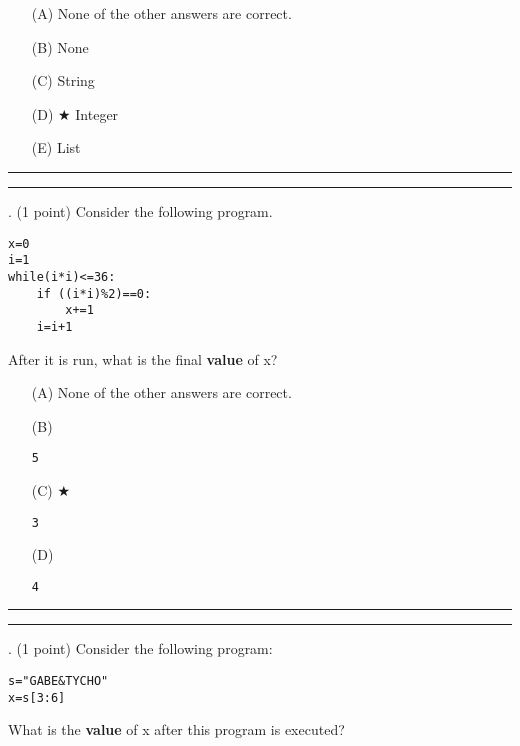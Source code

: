 \documentclass{article}
\begin{document}
\begin{enumerate}
\item[(A)]
None of the other answers are correct.

\item[(B)]
None

\item[(C)]
String

\item[(D)] $\bigstar$ 
Integer

\item[(E)]
List

\end{enumerate}

\vspace*{2em}
\hrule
\vspace{2em}

\vspace{2em}
\hrule height 2pt


\newpage
{}. (1 point)
Consider the following program.
\begin{verbatim}
x=0
i=1
while(i*i)<=36:
    if ((i*i)%2)==0:
        x+=1
    i=i+1
\end{verbatim}
After it is run, what is the final \textbf{value} of x?


\begin{enumerate}
\item[(A)]
None of the other answers are correct.

\item[(B)]
\begin{verbatim}5\end{verbatim}

\item[(C)] $\bigstar$ 
\begin{verbatim}3\end{verbatim}

\item[(D)]
\begin{verbatim}4\end{verbatim}

\end{enumerate}

\vspace*{2em}
\hrule
\vspace{2em}

\vspace{2em}
\hrule height 2pt


\newpage
{}. (1 point)
Consider the following program:
\begin{verbatim}
s="GABE&TYCHO"
x=s[3:6]
\end{verbatim}
What is the \textbf{value} of x after this program is executed?
\end{document}
